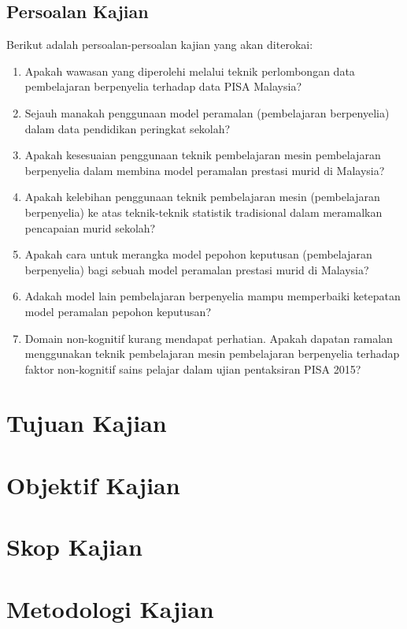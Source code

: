 \subsection{Persoalan Kajian}
Berikut adalah persoalan-persoalan kajian yang akan diterokai:
\begin{enumerate}
  \item Apakah wawasan yang diperolehi melalui teknik perlombongan data pembelajaran berpenyelia terhadap data PISA Malaysia?
  \item Sejauh manakah penggunaan model peramalan (pembelajaran berpenyelia) dalam data pendidikan peringkat sekolah?
  \item Apakah kesesuaian penggunaan teknik pembelajaran mesin pembelajaran berpenyelia dalam membina model peramalan prestasi murid di Malaysia?
  \item Apakah kelebihan penggunaan teknik pembelajaran mesin (pembelajaran berpenyelia) ke atas teknik-teknik statistik tradisional dalam meramalkan pencapaian murid sekolah?
  \item Apakah cara untuk merangka model pepohon keputusan (pembelajaran berpenyelia) bagi sebuah model peramalan prestasi murid di Malaysia?
  \item Adakah model lain pembelajaran berpenyelia mampu memperbaiki ketepatan model peramalan pepohon keputusan?
  \item Domain non-kognitif kurang mendapat perhatian. Apakah dapatan ramalan menggunakan teknik pembelajaran mesin pembelajaran berpenyelia terhadap faktor non-kognitif sains pelajar dalam ujian pentaksiran PISA 2015?
\end{enumerate}

\section{Tujuan Kajian}

\section{Objektif Kajian}

\section{Skop Kajian}

\section{Metodologi Kajian}

